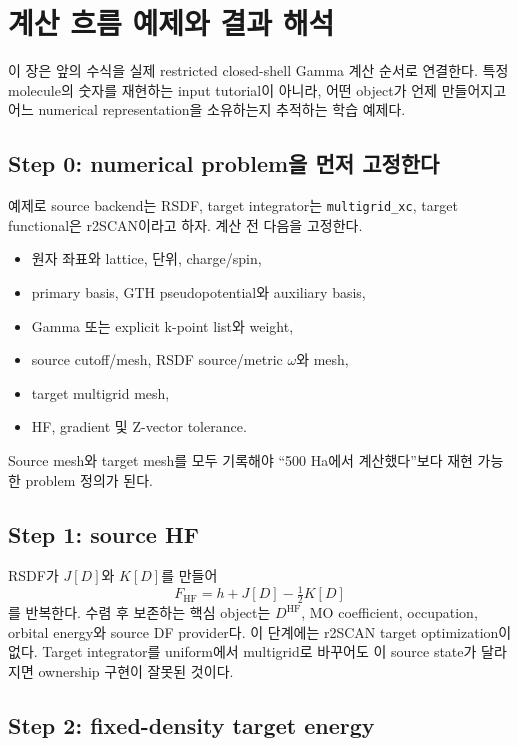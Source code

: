 \section{계산 흐름 예제와 결과 해석}
\label{sec:worked-workflow}

이 장은 앞의 수식을 실제 restricted closed-shell Gamma 계산 순서로 연결한다. 특정
molecule의 숫자를 재현하는 input tutorial이 아니라, 어떤 object가 언제 만들어지고
어느 numerical representation을 소유하는지 추적하는 학습 예제다.

\subsection{Step 0: numerical problem을 먼저 고정한다}

예제로 source backend는 RSDF, target integrator는 \texttt{multigrid\_xc}, target
functional은 r2SCAN이라고 하자. 계산 전 다음을 고정한다.
\begin{itemize}
  \item 원자 좌표와 lattice, 단위, charge/spin,
  \item primary basis, GTH pseudopotential와 auxiliary basis,
  \item Gamma 또는 explicit k-point list와 weight,
  \item source cutoff/mesh, RSDF source/metric $\omega$와 mesh,
  \item target multigrid mesh,
  \item HF, gradient 및 Z-vector tolerance.
\end{itemize}
Source mesh와 target mesh를 모두 기록해야 ``500 Ha에서 계산했다''보다 재현 가능한
problem 정의가 된다.

\subsection{Step 1: source HF}

RSDF가 $J[D]$와 $K[D]$를 만들어
\begin{equation}
  F_{\mathrm{HF}}=h+J[D]-\tfrac12K[D]
\end{equation}
를 반복한다. 수렴 후 보존하는 핵심 object는 $D^{\mathrm{HF}}$, MO coefficient,
occupation, orbital energy와 source DF provider다. 이 단계에는 r2SCAN target
optimization이 없다. Target integrator를 uniform에서 multigrid로 바꾸어도 이 source
state가 달라지면 ownership 구현이 잘못된 것이다.

\subsection{Step 2: fixed-density target energy}

